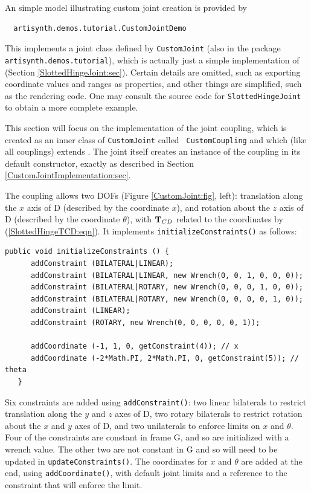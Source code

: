 An simple model illustrating custom joint creation is provided by
\begin{verbatim}
  artisynth.demos.tutorial.CustomJointDemo
\end{verbatim}
%
This implements a joint class defined by {\tt CustomJoint} (also in
the package {\tt artisynth.demos.tutorial}), which is actually just a
simple implementation of
 (Section
\ref{SlottedHingeJoint:sec}). Certain details are omitted, such as
exporting coordinate values and ranges as properties, and other things
are simplified, such as the rendering code. One may consult the source
code for {\tt SlottedHingeJoint} to obtain a more complete example.

This section will focus on the implementation of the joint coupling,
which is created as an inner class of {\tt CustomJoint} called {\tt
CustomCoupling} and which (like all couplings) extends
. The joint
itself creates an instance of the coupling in its default constructor,
exactly as described in Section
\ref{CustomJointImplementation:sec}.

The coupling allows two DOFs (Figure \ref{CustomJoint:fig}, left):
translation along the $x$ axis of D (described by the coordinate $x$),
and rotation about the $z$ axis of D (described by the coordinate
$\theta$), with ${\bf T}_{CD}$ related to the coordinates by
(\ref{SlottedHingeTCD:eqn}). It implements
{\tt initializeConstraints()} as follows:
%
\begin{lstlisting}[]
   public void initializeConstraints () {
      addConstraint (BILATERAL|LINEAR);
      addConstraint (BILATERAL|LINEAR, new Wrench(0, 0, 1, 0, 0, 0));
      addConstraint (BILATERAL|ROTARY, new Wrench(0, 0, 0, 1, 0, 0));
      addConstraint (BILATERAL|ROTARY, new Wrench(0, 0, 0, 0, 1, 0));
      addConstraint (LINEAR);
      addConstraint (ROTARY, new Wrench(0, 0, 0, 0, 0, 1));
   
      addCoordinate (-1, 1, 0, getConstraint(4)); // x
      addCoordinate (-2*Math.PI, 2*Math.PI, 0, getConstraint(5)); // theta
   }
\end{lstlisting}
%
Six constraints are added using {\tt addConstraint()}: two linear
bilaterals to restrict translation along the $y$ and $z$ axes of D, two
rotary bilaterals to restrict rotation about the $x$ and $y$ axes of D,
and two unilaterals to enforce limits on $x$ and $\theta$. Four of the
constraints are constant in frame G, and so are initialized with a
wrench value. The other two are not constant in G and so will need to
be updated in {\tt updateConstraints()}. The coordinates for
$x$ and $\theta$ are added at the end, using {\tt addCoordinate()},
with default joint limits and a reference to the constraint that will
enforce the limit.

